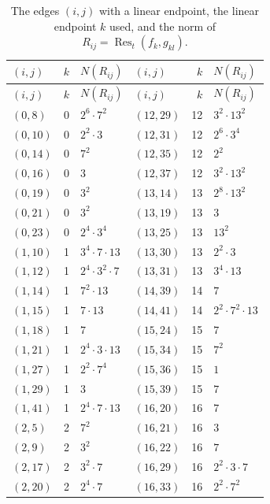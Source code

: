 \documentclass[11pt]{article}
\begin{document}
\begingroup\small
\setlength{\LTcapwidth}{\textwidth}
\begin{longtable}{@{}lrl@{\qquad}lrl@{}}
\caption{The edges $(i,j)$ with a linear endpoint, the linear endpoint $k$ used, and the norm of $R_{ij}=\operatorname{Res}_t(f_k,g_{kl})$.}\label{tab:sep}\\
\hline $(i,j)$ & $k$ & $N(R_{ij})$ & $(i,j)$ & $k$ & $N(R_{ij})$\\\hline\endfirsthead\hline $(i,j)$ & $k$ & $N(R_{ij})$ & $(i,j)$ & $k$ & $N(R_{ij})$\\\hline\endhead\hline\endfoot
$(0,8)$ & 0 & $2^{6}\cdot 7^{2}$ & $(12,29)$ & 12 & $3^{2}\cdot 13^{2}$\\
$(0,10)$ & 0 & $2^{2}\cdot 3$ & $(12,31)$ & 12 & $2^{6}\cdot 3^{4}$\\
$(0,14)$ & 0 & $7^{2}$ & $(12,35)$ & 12 & $2^{2}$\\
$(0,16)$ & 0 & $3$ & $(12,37)$ & 12 & $3^{2}\cdot 13^{2}$\\
$(0,19)$ & 0 & $3^{2}$ & $(13,14)$ & 13 & $2^{8}\cdot 13^{2}$\\
$(0,21)$ & 0 & $3^{2}$ & $(13,19)$ & 13 & $3$\\
$(0,23)$ & 0 & $2^{4}\cdot 3^{4}$ & $(13,25)$ & 13 & $13^{2}$\\
$(1,10)$ & 1 & $3^{4}\cdot 7\cdot 13$ & $(13,30)$ & 13 & $2^{2}\cdot 3$\\
$(1,12)$ & 1 & $2^{4}\cdot 3^{2}\cdot 7$ & $(13,31)$ & 13 & $3^{4}\cdot 13$\\
$(1,14)$ & 1 & $7^{2}\cdot 13$ & $(14,39)$ & 14 & $7$\\
$(1,15)$ & 1 & $7\cdot 13$ & $(14,41)$ & 14 & $2^{2}\cdot 7^{2}\cdot 13$\\
$(1,18)$ & 1 & $7$ & $(15,24)$ & 15 & $7$\\
$(1,21)$ & 1 & $2^{4}\cdot 3\cdot 13$ & $(15,34)$ & 15 & $7^{2}$\\
$(1,27)$ & 1 & $2^{2}\cdot 7^{4}$ & $(15,36)$ & 15 & $1$\\
$(1,29)$ & 1 & $3$ & $(15,39)$ & 15 & $7$\\
$(1,41)$ & 1 & $2^{4}\cdot 7\cdot 13$ & $(16,20)$ & 16 & $7$\\
$(2,5)$ & 2 & $7^{2}$ & $(16,21)$ & 16 & $3$\\
$(2,9)$ & 2 & $3^{2}$ & $(16,22)$ & 16 & $7$\\
$(2,17)$ & 2 & $3^{2}\cdot 7$ & $(16,29)$ & 16 & $2^{2}\cdot 3\cdot 7$\\
$(2,20)$ & 2 & $2^{4}\cdot 7$ & $(16,33)$ & 16 & $2^{2}\cdot 7^{2}$\\

\end{longtable}
\end{document}
